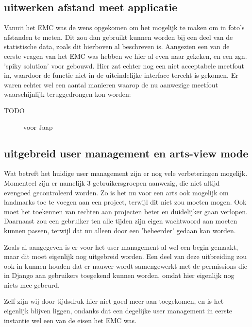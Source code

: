 \subsection{uitwerken afstand meet applicatie}
Vanuit het EMC was de wens opgekomen om het mogelijk te maken om in foto's afstanden te meten.
Dit zou dan gebruikt kunnen worden bij een deel van de statistische data, zoals dit hierboven al beschreven is.
Aangezien een van de eerste vragen van het EMC was hebben we hier al even naar gekeken, en een zgn. 'spiky solution' voor gebouwd.
Hier zat echter nog een niet acceptabele meetfout in, waardoor de functie niet in de uiteindelijke interface terecht is gekomen.
Er waren echter wel een aantal manieren waarop de nu aanwezige meetfout waarschijnlijk teruggedrongen kon worden:
\begin{description}
	\item[TODO] voor Jaap
\end{description}

\subsection{uitgebreid user management en arts-view mode}
Wat betreft het huidige user management zijn er nog vele verbeteringen mogelijk.
Momenteel zijn er namelijk 3 gebruikersgroepen aanwezig, die niet altijd evengoed gecontroleerd worden.
Zo is het nu voor een arts ook mogelijk om landmarks toe te voegen aan een project, terwijl dit niet zou moeten mogen.
Ook moet het toekennen van rechten aan projecten beter en duidelijker gaan verlopen.
Daarnaast zou een gebruiker ten alle tijden zijn eigen wachtwoord aan moeten kunnen passen, terwijl dat nu alleen door een 'beheerder' gedaan kan worden.

Zoals al aangegeven is er voor het user management al wel een begin gemaakt, maar dit moet eigenlijk nog uitgebreid worden.
Een deel van deze uitbreiding zou ook in kunnen houden dat er nauwer wordt samengewerkt met de permissions die in Django aan gebruikers toegekend kunnen worden, omdat hier eigenlijk nog niets mee gebeurd.

Zelf zijn wij door tijdsdruk hier niet goed meer aan toegekomen, en is het eigenlijk blijven liggen, ondanks dat een degelijke user management in eerste instantie wel een van de eisen het EMC was.

